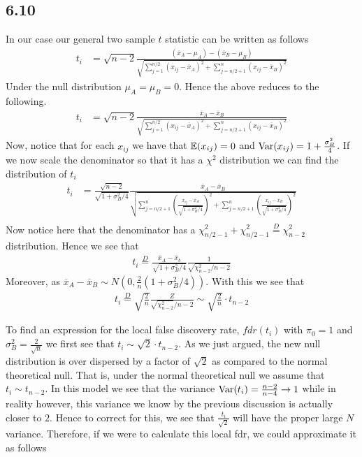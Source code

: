 \documentclass[11pt]{article}
\begin{document}
\subsection{6.10}
In our case our general two sample $t$ statistic can be written as follows 
\begin{align*}
t_i &= \sqrt{n-2}\frac{(\overline{x}_A - \mu_A) - (\overline{x}_B - \mu_B)}{\sqrt{\sum_{j=1}^{n/2}(x_{ij}-\overline{x}_A)^2 +\sum_{j=n/2+1}^{n}(x_{ij}-\overline{x}_B)^2  }}
\end{align*}
Under the null distribution $\mu_A = \mu_B = 0$. Hence the above reduces to the following. 
\begin{align*}
t_i &= \sqrt{n-2}\frac{\overline{x}_A - \overline{x}_B }{\sqrt{\sum_{j=1}^{n/2}(x_{ij}-\overline{x}_A)^2 +\sum_{j=n/2+1}^{n}(x_{ij}-\overline{x}_B)^2  }}
\end{align*}
Now, notice that for each $x_{ij}$ we have that ${\mathbb{E}}(x_{ij}) = 0$ and ${\text{Var}}(x_{ij}) = 1 + \frac{\sigma_B^2}{4}$. If we now scale the denominator so that it has a $\chi^2$ distribution we can find the distribution of $t_i$
\begin{align*}
t_i &= \frac{\sqrt{n-2}}{\sqrt{1+\sigma^2_B/4}}\frac{\overline{x}_A - \overline{x}_B }{\sqrt{\sum_{j=n/2+1}^{n}(\frac{x_{ij}-\overline{x}_A}{\sqrt{1 + \sigma^2_B/4}})^2  +\sum_{j=n/2+1}^{n}(\frac{x_{ij}-\overline{x}_B}{\sqrt{1 + \sigma^2_B/4}})^2 }}\\
\end{align*}
Now notice here that the denominator has a $\chi^2_{n/2 - 1} + \chi^2_{n/2 - 1}  \overset{D}{=} \chi^2_{n-2}$ distribution. Hence we see that
\begin{align*}
t_i \overset{D}{=}\frac{\overline{x}_A - \overline{x}_b}{\sqrt{1+\sigma^2_B/4}}\frac{1}{\sqrt{\chi^2_{n-2}/n-2}}
\end{align*}
Moreover, as $\overline{x}_A-\overline{x}_B\sim N(0, \frac{2}{n}\left(1 + \sigma^2_B/4\right))$. With this we see that 
\begin{align*}
t_i \overset{D}{=}\sqrt{\frac{2}{n}}\frac{Z}{\sqrt{\chi_{n-2}^2}/n-2}\sim \sqrt{\frac{2}{n}}\cdot t_{n-2}
\end{align*}


To find an expression for the local false discovery rate, $fdr(t_i)$ with $\pi_0 = 1$ and $\sigma_B^2 = \frac{2}{\sqrt{n}}$ we first see that $t_i\sim \sqrt{2}\cdot t_{n-2}$. As we just argued, the new null distribution is over dispersed by a factor of $\sqrt{2}$ as compared to the normal theoretical null.  That is, under the normal theoretical null we assume that $t_i \sim t_{n-2}$. In this model we see that the variance ${\text{Var}}(t_i) = \frac{n-2}{n-4}\to 1$ while in reality however, this variance we know by the previous discussion is actually closer to $2$. Hence to correct for this, we see that $\frac{t_i}{\sqrt{2}}$ will have the proper large $N$ variance. Therefore, if we were to calculate this local fdr, we could approximate it as follows 
\end{document}
